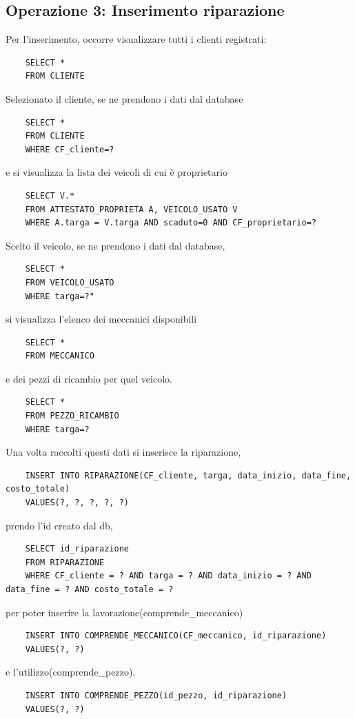 \documentclass[a4paper,12pt]{report}
\begin{document}
\subsection*{Operazione 3: Inserimento riparazione}
Per l'inserimento, occorre visualizzare tutti i clienti registrati:
\begin{lstlisting}
	SELECT * 
	FROM CLIENTE
\end{lstlisting}
Selezionato il cliente, se ne prendono i dati dal database
\begin{lstlisting}
	SELECT * 
	FROM CLIENTE
	WHERE CF_cliente=?
\end{lstlisting}
e si visualizza la lista dei veicoli di cui è proprietario
\begin{lstlisting}
	SELECT V.* 
	FROM ATTESTATO_PROPRIETA A, VEICOLO_USATO V 
	WHERE A.targa = V.targa AND scaduto=0 AND CF_proprietario=?
\end{lstlisting}
Scelto il veicolo, se ne prendono i dati dal database,
\begin{lstlisting}
	SELECT * 
	FROM VEICOLO_USATO 
	WHERE targa=?"
\end{lstlisting}
si visualizza l'elenco dei meccanici disponibili 
\begin{lstlisting}
	SELECT * 
	FROM MECCANICO
\end{lstlisting}
e dei pezzi di ricambio per quel veicolo.
\begin{lstlisting}
	SELECT * 
	FROM PEZZO_RICAMBIO 
	WHERE targa=?
\end{lstlisting}
Una volta raccolti questi dati si inserisce la riparazione,
\begin{lstlisting}
	INSERT INTO RIPARAZIONE(CF_cliente, targa, data_inizio, data_fine, costo_totale) 
	VALUES(?, ?, ?, ?, ?)
\end{lstlisting}
prendo l'id creato dal db,
\begin{lstlisting}
	SELECT id_riparazione 
	FROM RIPARAZIONE 
	WHERE CF_cliente = ? AND targa = ? AND data_inizio = ? AND data_fine = ? AND costo_totale = ?
\end{lstlisting}
per poter inserire la lavorazione(comprende\_meccanico)
\begin{lstlisting}
	INSERT INTO COMPRENDE_MECCANICO(CF_meccanico, id_riparazione) 
	VALUES(?, ?)
\end{lstlisting}
e l'utilizzo(comprende\_pezzo).
\begin{lstlisting}
	INSERT INTO COMPRENDE_PEZZO(id_pezzo, id_riparazione) 
	VALUES(?, ?)
\end{lstlisting}
\end{document}
